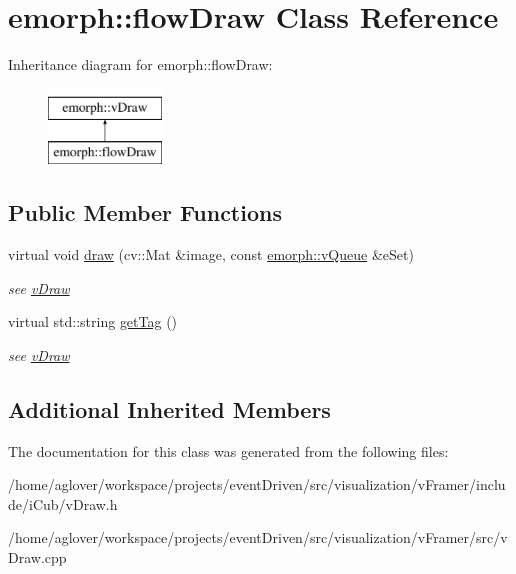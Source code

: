 \hypertarget{classemorph_1_1flowDraw}{\section{emorph\-:\-:flow\-Draw Class Reference}
\label{classemorph_1_1flowDraw}
}
Inheritance diagram for emorph\-:\-:flow\-Draw\-:\begin{figure}[H]
\begin{center}
\leavevmode
\includegraphics[height=2.000000cm]{classemorph_1_1flowDraw}
\end{center}
\end{figure}
\subsection*{Public Member Functions}
\begin{DoxyCompactItemize}
\item 
\hypertarget{classemorph_1_1flowDraw_a28eeaf6490d8e4f5b334200562d2c31b}{virtual void \hyperlink{classemorph_1_1flowDraw_a28eeaf6490d8e4f5b334200562d2c31b}{draw} (cv\-::\-Mat \&image, const \hyperlink{classemorph_1_1vQueue}{emorph\-::v\-Queue} \&e\-Set)}\label{classemorph_1_1flowDraw_a28eeaf6490d8e4f5b334200562d2c31b}

\begin{DoxyCompactList}\small\item\em see \hyperlink{classemorph_1_1vDraw}{v\-Draw} \end{DoxyCompactList}\item 
\hypertarget{classemorph_1_1flowDraw_a3ba90985c688de6ac753b575e7a322f0}{virtual std\-::string \hyperlink{classemorph_1_1flowDraw_a3ba90985c688de6ac753b575e7a322f0}{get\-Tag} ()}\label{classemorph_1_1flowDraw_a3ba90985c688de6ac753b575e7a322f0}

\begin{DoxyCompactList}\small\item\em see \hyperlink{classemorph_1_1vDraw}{v\-Draw} \end{DoxyCompactList}\end{DoxyCompactItemize}
\subsection*{Additional Inherited Members}


The documentation for this class was generated from the following files\-:\begin{DoxyCompactItemize}
\item 
/home/aglover/workspace/projects/event\-Driven/src/visualization/v\-Framer/include/i\-Cub/v\-Draw.\-h\item 
/home/aglover/workspace/projects/event\-Driven/src/visualization/v\-Framer/src/v\-Draw.\-cpp\end{DoxyCompactItemize}
